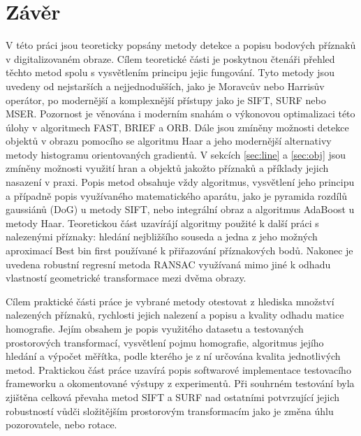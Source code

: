 

\chapter{Závěr}

V této práci jsou teoreticky popsány metody detekce a popisu bodových příznaků v digitalizovaném obraze. Cílem teoretické části je poskytnou čtenáři přehled těchto metod spolu s vysvětlením principu jejic fungování. Tyto metody jsou uvedeny od nejstarších a nejjednodušších, jako je Moravcův nebo Harrisův operátor, po modernější a komplexnější přístupy jako je SIFT, SURF nebo MSER. Pozornost je věnována i moderním snahám o výkonovou optimalizaci této úlohy v algoritmech FAST, BRIEF a ORB. Dále jsou zmíněny možnosti detekce objektů v obrazu pomocího se algoritmu Haar a jeho modernější alternativy metody histogramu orientovaných gradientů. V sekcích \ref{sec:line} a \ref{sec:obj} jsou zmíněny možnosti využití hran a objektů jakožto příznaků a příklady jejich nasazení v praxi. Popis metod obsahuje vždy algoritmus, vysvětlení jeho principu a případně popis využívaného matematického aparátu, jako je pyramida rozdílů gaussiánů (DoG) u metody SIFT, nebo integrální obraz a algoritmus AdaBoost u metody Haar. Teoretickou část uzavírájí algoritmy použité k další práci s nalezenými příznaky: hledání nejbližšího souseda a jedna z jeho možných aproximací Best bin first používané k přiřazování příznakových bodů. Nakonec je uvedena robustní regresní metoda RANSAC využívaná mimo jiné k odhadu vlastností geometrické transformace mezi dvěma obrazy.

Cílem praktické části práce je vybrané metody otestovat z hlediska množství nalezených příznaků, rychlosti jejich nalezení a popisu a kvality odhadu matice homografie. Jejím obsahem je popis využitého datasetu a testovaných prostorových transformací, vysvětlení pojmu homografie, algoritmus jejího hledání a výpočet měřítka, podle kterého je z ní určována kvalita jednotlivých metod. Praktickou část práce uzavírá popis softwarové implementace testovacího frameworku a okomentované výstupy z experimentů. Při souhrném testování byla zjištěna celková převaha metod SIFT a SURF nad ostatními potvrzující jejich robustností vůdči složitějším prostorovým transformacím jako je změna úhlu pozorovatele, nebo rotace.